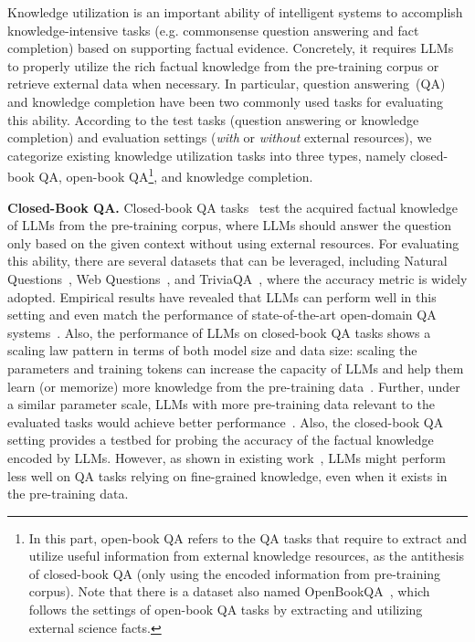 {{{{{Knowledge utilization is an important ability of intelligent systems to accomplish knowledge-intensive tasks (e.g. commonsense question answering and fact completion) based on supporting factual evidence. Concretely, it requires LLMs to {properly utilize the rich factual knowledge from the pre-training corpus or retrieve external data when necessary.} In particular, question answering~(QA) and knowledge completion have been two commonly used tasks for evaluating this ability. According to the test tasks (question answering or knowledge completion) and evaluation settings (\emph{with} or \emph{without} external resources), we categorize existing knowledge utilization tasks into three types, namely closed-book QA, open-book QA\footnote{In this part, open-book QA refers to the QA tasks that require to extract and utilize useful information from external knowledge resources, as the antithesis of closed-book QA (only using the encoded information from  pre-training corpus). Note that there is a dataset  also named OpenBookQA~\cite{Mihaylov-EMNLP-2018-Can}, which  follows the settings of open-book QA tasks by extracting and utilizing  external science facts.}, and knowledge completion.

\textbf{Closed-Book QA.} Closed-book QA tasks~\cite{Roberts-EMNLP-2020-How} test the acquired factual knowledge of LLMs from the pre-training corpus, where LLMs should answer the question only based on the given context without using external resources. For evaluating this ability, there are  several datasets that can be leveraged, including  Natural Questions~\cite{Kwiatkowski-ACL-2019-Natural}, Web Questions~\cite{Berant-EMNLP-2013-Semantic}, and TriviaQA~\cite{Joshi-ACL-2017-TriviaQA}, {where the accuracy metric is widely adopted.} Empirical results have revealed that LLMs can perform well in this setting and even match the performance of state-of-the-art {open-domain} QA systems~\cite{Chowdhery-arxiv-2022-PaLM}. Also, the performance of LLMs on closed-book QA tasks shows a scaling law pattern in terms of both model size and data size: scaling the parameters and training tokens can increase the capacity of LLMs and help them learn (or memorize) more knowledge from the pre-training data~\cite{Chowdhery-arxiv-2022-PaLM}. Further, under a similar parameter scale, LLMs with more pre-training data relevant to the evaluated tasks would achieve better performance~\cite{Nakano-arxiv-2021-WebGPT}. Also, the closed-book QA setting  provides a testbed for probing the accuracy of the factual knowledge encoded by LLMs. {However, as shown in existing work~\cite{Brown-NeurIPS-2020-Language}, LLMs might perform less well on QA tasks relying on fine-grained knowledge, even when it exists in the pre-training data.}

}}}}}

